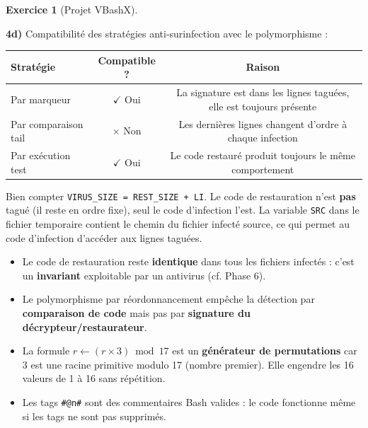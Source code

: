 \documentclass[a4paper,11pt]{article}
\theoremstyle{plain}
\theoremstyle{definition}
\newtheorem{exercice}{Exercice}
\begin{document}
\begin{exercice}[Projet VBashX]
\begin{correction}
\textbf{4d)} Compatibilité des stratégies anti-surinfection avec le polymorphisme :
\begin{center}
\begin{tabular}{lcc}
\toprule
\textbf{Stratégie} & \textbf{Compatible ?} & \textbf{Raison} \\
\midrule
Par marqueur & $\checkmark$ Oui & La signature est dans les lignes taguées, elle est toujours présente \\
Par comparaison tail & $\times$ Non & Les dernières lignes changent d'ordre à chaque infection \\
Par exécution test & $\checkmark$ Oui & Le code restauré produit toujours le même comportement \\
\bottomrule
\end{tabular}
\end{center}

\begin{attention}
Bien compter \texttt{VIRUS\_SIZE = REST\_SIZE + LI}. Le code de restauration n'est \textbf{pas} tagué (il reste en ordre fixe), seul le code d'infection l'est. La variable \texttt{SRC} dans le fichier temporaire contient le chemin du fichier infecté source, ce qui permet au code d'infection d'accéder aux lignes taguées.
\end{attention}

\begin{pointcle}
\begin{itemize}
    \item Le code de restauration reste \textbf{identique} dans tous les fichiers infectés : c'est un \textbf{invariant} exploitable par un antivirus (cf. Phase 6).
    \item Le polymorphisme par réordonnancement empêche la détection par \textbf{comparaison de code} mais pas par \textbf{signature du décrypteur/restaurateur}.
    \item La formule $r \leftarrow (r \times 3) \bmod 17$ est un \textbf{générateur de permutations} car 3 est une racine primitive modulo 17 (nombre premier). Elle engendre les 16 valeurs de 1 à 16 sans répétition.
    \item Les tags \texttt{\#@n\#} sont des commentaires Bash valides : le code fonctionne même si les tags ne sont pas supprimés.
\end{itemize}
\end{pointcle}

\end{correction}




\end{exercice}
\end{document}
